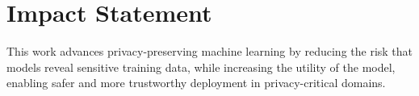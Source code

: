 \documentclass{article}
\theoremstyle{plain}
\theoremstyle{definition}
\theoremstyle{remark}
\begin{document}
\section*{Impact Statement}
This work advances privacy-preserving machine learning by reducing the risk that models reveal sensitive training data, while increasing the utility of the model, enabling safer and more trustworthy deployment in privacy-critical domains.






\newpage
\appendix
\onecolumn
\end{document}
